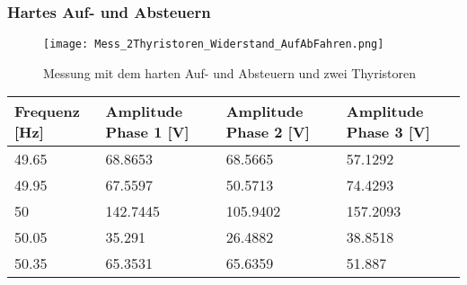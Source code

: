\begin{appendix}
\newpage
\subsubsection*{Hartes Auf- und Absteuern}

\begin{figure}[ht!]
	\centering
	\texttt{[image: Mess\_2Thyristoren\_Widerstand\_AufAbFahren.png]}	
	\caption{Messung mit dem harten Auf- und Absteuern und zwei Thyristoren}\label{Mess_2Thyristoren_Widerstand_AufAbFahren}	
\end{figure}


\begin{table}[ht!]
	\centering
	\begin{tabular}{|l|l|l|l|}
		\hline
		Frequenz {[}Hz{]} & Amplitude Phase 1 {[}V{]}                                                           & Amplitude Phase 2 {[}V{]}                                                           & Amplitude Phase 3 {[}V{]}                                                           \\ \hline
		49.65             & 68.8653                                                                             & 68.5665                                                                             & 57.1292                                                                             \\ \hline
		49.95             & 67.5597                                                                             & 50.5713                                                                             & 74.4293                                                                             \\ \hline
		50                & 142.7445                                                                            & 105.9402                                                                            & 157.2093                                                                            \\ \hline
		50.05             & 35.291                                                                              & 26.4882                                                                             & 38.8518                                                                             \\ \hline
		50.35             & 65.3531                                                                             & 65.6359                                                                             & 51.887                                                                              \\ \hline

\end{tabular}
\end{table}
\end{appendix}
